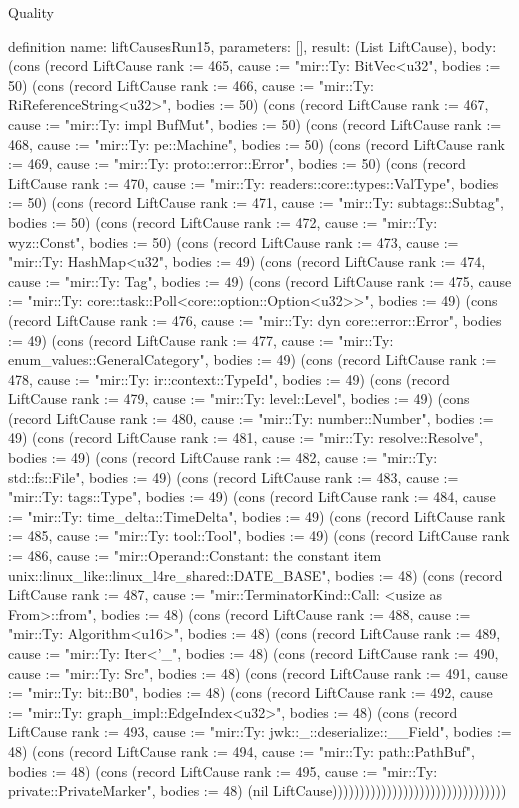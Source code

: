 \begin{lexlean}{Quality}
\begin{semanticmodule}
definition{
  name: liftCausesRun15,
  parameters: [],
  result: (List LiftCause),
  body: (cons (record LiftCause {rank := 465, cause := "mir::Ty: BitVec<u32", bodies := 50}) (cons (record LiftCause {rank := 466, cause := "mir::Ty: RiReferenceString<u32>", bodies := 50}) (cons (record LiftCause {rank := 467, cause := "mir::Ty: impl BufMut", bodies := 50}) (cons (record LiftCause {rank := 468, cause := "mir::Ty: pe::Machine", bodies := 50}) (cons (record LiftCause {rank := 469, cause := "mir::Ty: proto::error::Error", bodies := 50}) (cons (record LiftCause {rank := 470, cause := "mir::Ty: readers::core::types::ValType", bodies := 50}) (cons (record LiftCause {rank := 471, cause := "mir::Ty: subtags::Subtag", bodies := 50}) (cons (record LiftCause {rank := 472, cause := "mir::Ty: wyz::Const", bodies := 50}) (cons (record LiftCause {rank := 473, cause := "mir::Ty: HashMap<u32", bodies := 49}) (cons (record LiftCause {rank := 474, cause := "mir::Ty: Tag", bodies := 49}) (cons (record LiftCause {rank := 475, cause := "mir::Ty: core::task::Poll<core::option::Option<u32>>", bodies := 49}) (cons (record LiftCause {rank := 476, cause := "mir::Ty: dyn core::error::Error", bodies := 49}) (cons (record LiftCause {rank := 477, cause := "mir::Ty: enum_values::GeneralCategory", bodies := 49}) (cons (record LiftCause {rank := 478, cause := "mir::Ty: ir::context::TypeId", bodies := 49}) (cons (record LiftCause {rank := 479, cause := "mir::Ty: level::Level", bodies := 49}) (cons (record LiftCause {rank := 480, cause := "mir::Ty: number::Number", bodies := 49}) (cons (record LiftCause {rank := 481, cause := "mir::Ty: resolve::Resolve", bodies := 49}) (cons (record LiftCause {rank := 482, cause := "mir::Ty: std::fs::File", bodies := 49}) (cons (record LiftCause {rank := 483, cause := "mir::Ty: tags::Type", bodies := 49}) (cons (record LiftCause {rank := 484, cause := "mir::Ty: time_delta::TimeDelta", bodies := 49}) (cons (record LiftCause {rank := 485, cause := "mir::Ty: tool::Tool", bodies := 49}) (cons (record LiftCause {rank := 486, cause := "mir::Operand::Constant: the constant item unix::linux_like::linux_l4re_shared::DATE_BASE", bodies := 48}) (cons (record LiftCause {rank := 487, cause := "mir::TerminatorKind::Call: <usize as From>::from", bodies := 48}) (cons (record LiftCause {rank := 488, cause := "mir::Ty: Algorithm<u16>", bodies := 48}) (cons (record LiftCause {rank := 489, cause := "mir::Ty: Iter<'_", bodies := 48}) (cons (record LiftCause {rank := 490, cause := "mir::Ty: Src", bodies := 48}) (cons (record LiftCause {rank := 491, cause := "mir::Ty: bit::B0", bodies := 48}) (cons (record LiftCause {rank := 492, cause := "mir::Ty: graph_impl::EdgeIndex<u32>", bodies := 48}) (cons (record LiftCause {rank := 493, cause := "mir::Ty: jwk::_::deserialize::__Field", bodies := 48}) (cons (record LiftCause {rank := 494, cause := "mir::Ty: path::PathBuf", bodies := 48}) (cons (record LiftCause {rank := 495, cause := "mir::Ty: private::PrivateMarker", bodies := 48}) (nil LiftCause))))))))))))))))))))))))))))))))
}


\end{semanticmodule}
\end{lexlean}
